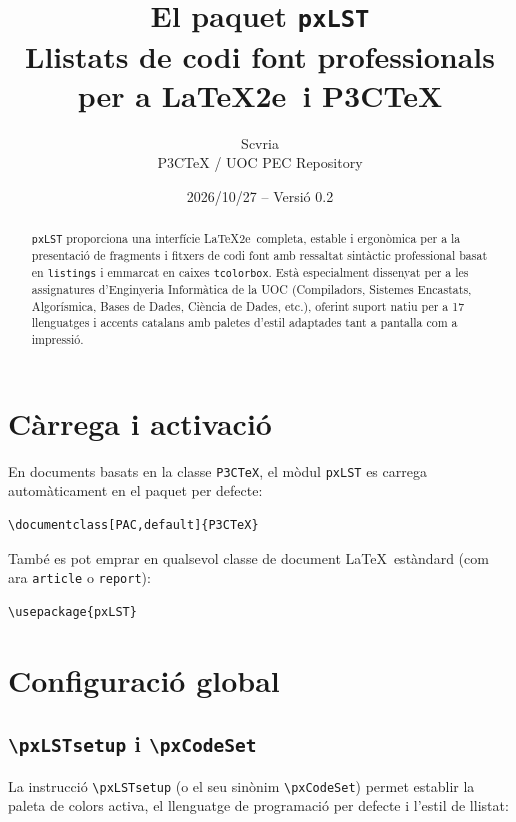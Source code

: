 \documentclass[11pt,a4paper]{article}
\title{El paquet \texttt{pxLST}\\
  \large Llistats de codi font professionals per a \LaTeX2e\ i P3CTeX}
\author{Scvria\\P3CTeX / UOC PEC Repository}
\date{2026/10/27 -- Versi\'o 0.2}
\begin{document}
\maketitle

\begin{abstract}
  \texttt{pxLST} proporciona una interf\'icie \LaTeX2e\ completa, estable i ergon\`omica per a la
  presentaci\'o de fragments i fitxers de codi font amb ressaltat sint\`actic professional basat en
  \texttt{listings} i emmarcat en caixes \texttt{tcolorbox}. Est\`a especialment dissenyat per a les
  assignatures d'Enginyeria Inform\`atica de la UOC (Compiladors, Sistemes Encastats, Algor\'ismica,
  Bases de Dades, Ci\`encia de Dades, etc.), oferint suport natiu per a 17 llenguatges i accents catalans
  amb paletes d'estil adaptades tant a pantalla com a impressi\'o.
\end{abstract}

\tableofcontents
\newpage

\section{C\`arrega i activaci\'o}

En documents basats en la classe \texttt{P3CTeX}, el m\`odul \texttt{pxLST} es carrega autom\`aticament
en el paquet per defecte:

\begin{verbatim}
\documentclass[PAC,default]{P3CTeX}
\end{verbatim}

Tamb\'e es pot emprar en qualsevol classe de document \LaTeX\ est\`andard (com ara \texttt{article} o \texttt{report}):

\begin{verbatim}
\usepackage{pxLST}
\end{verbatim}

\section{Configuraci\'o global}

\subsection{\texttt{\textbackslash pxLSTsetup} i \texttt{\textbackslash pxCodeSet}}

La instrucci\'o \texttt{\textbackslash pxLSTsetup} (o el seu sin\`onim \texttt{\textbackslash pxCodeSet})
permet establir la paleta de colors activa, el llenguatge de programaci\'o per defecte i l'estil de llistat:
\end{document}
